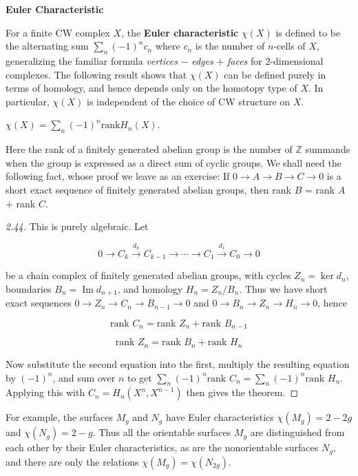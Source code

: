 \textbf{Euler Characteristic}

For a finite CW complex $X$, the \textbf{Euler characteristic} $\chi(X)$ is defined to be the
alternating sum $\sum_n (-1)^n c_n$ where $c_n$ is the number of $n$-cells of $X$, generalizing
the familiar formula \textit{vertices} $-$ \textit{edges} $+$ \textit{faces} for 2-dimensional complexes. The
following result shows that $\chi(X)$ can be defined purely in terms of homology, and
hence depends only on the homotopy type of $X$. In particular, $\chi(X)$ is independent
of the choice of CW structure on $X$.

\begin{theorem}
\label{thm:euler-characteristic-homology}
$\chi(X) = \sum_n (-1)^n \text{rank} H_n(X)$.
\end{theorem}

Here the rank of a finitely generated abelian group is the number of $\mathbb{Z}$ summands
when the group is expressed as a direct sum of cyclic groups. We shall need the
following fact, whose proof we leave as an exercise: If $0 \to A \to B \to C \to 0$ is a short
exact sequence of finitely generated abelian groups, then rank $B$ = rank $A$ + rank $C$.
\begin{proof}[2.44]
 This is purely algebraic. Let

\[ 0 \to C_k \xrightarrow{d_k} C_{k-1} \to \cdots \to C_1 \xrightarrow{d_1} C_0 \to 0 \]

be a chain complex of finitely generated abelian groups, with cycles $Z_n = \ker d_n$,
boundaries $B_n = \operatorname{Im} d_{n+1}$, and homology $H_n = Z_n/B_n$. Thus we have short exact
sequences $0 \to Z_n \to C_n \to B_{n-1} \to 0$ and $0 \to B_n \to Z_n \to H_n \to 0$, hence

\[
\text{rank } C_n = \text{rank } Z_n + \text{rank } B_{n-1}
\]

\[
\text{rank } Z_n = \text{rank } B_n + \text{rank } H_n
\]

Now substitute the second equation into the first, multiply the resulting equation by
$(-1)^n$, and sum over $n$ to get $\sum_n (-1)^n \text{rank } C_n = \sum_n (-1)^n \text{rank } H_n$. Applying this
with $C_n = H_n(X^n, X^{n-1})$ then gives the theorem.
\end{proof}
For example, the surfaces $M_g$ and $N_g$ have Euler characteristics $\chi(M_g) = 2 - 2g$
and $\chi(N_g) = 2 - g$. Thus all the orientable surfaces $M_g$ are distinguished from each
other by their Euler characteristics, as are the nonorientable surfaces $N_g$, and there
are only the relations $\chi(M_g) = \chi(N_{2g})$.

